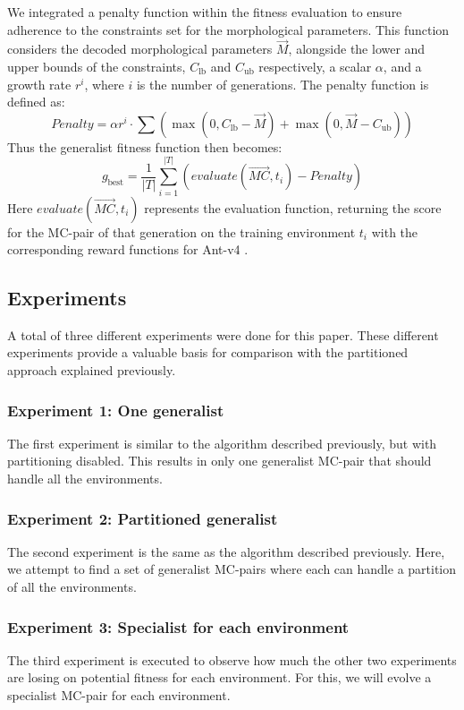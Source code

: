         We integrated a penalty function within the fitness evaluation to ensure adherence to the constraints set for the morphological parameters. This function considers the decoded morphological parameters $\overrightarrow{M}$, alongside the lower and upper bounds of the constraints, $C_\text{lb}$ and $C_\text{ub}$ respectively, a scalar $\alpha$, and a growth rate $r^i$, where $i$ is the number of generations. The penalty function is defined as:
        {\footnotesize
            \begin{equation}
                Penalty = \alpha r^i \cdot \sum(
                    \max(0, C_\text{lb} - \overrightarrow{M}) + 
                    \max(0, \overrightarrow{M} - C_\text{ub})
                )
            \end{equation}
        }
        Thus the generalist fitness function then becomes:
        {\footnotesize
            \begin{equation}
                g_{\text{best}} = \frac{1}{|T|} \sum_{i=1}^{|T|}(
                    evaluate(\overrightarrow{MC}, t_i) - Penalty
                ) 
            \end{equation}
        }
        Here $evaluate(\overrightarrow{MC}, t_i)$ represents the evaluation function, returning the score for the MC-pair of that generation on the training environment $t_i$ with the corresponding reward functions for Ant-v4 \cite{Gymnasium2023}.

    \subsection{Experiments}
        A total of three different experiments were done for this paper. These different experiments provide a valuable basis for comparison with the partitioned approach explained previously.
        \subsubsection{Experiment 1: One generalist}
            The first experiment is similar to the algorithm described previously, but with partitioning disabled. This results in only one generalist MC-pair that should handle all the environments.
        \subsubsection{Experiment 2: Partitioned generalist}
            The second experiment is the same as the algorithm described previously. Here, we attempt to find a set of generalist MC-pairs where each can handle a partition of all the environments. 
        \subsubsection{Experiment 3: Specialist for each environment}
            The third experiment is executed to observe how much the other two experiments are losing on potential fitness for each environment. For this, we will evolve a specialist MC-pair for each environment.